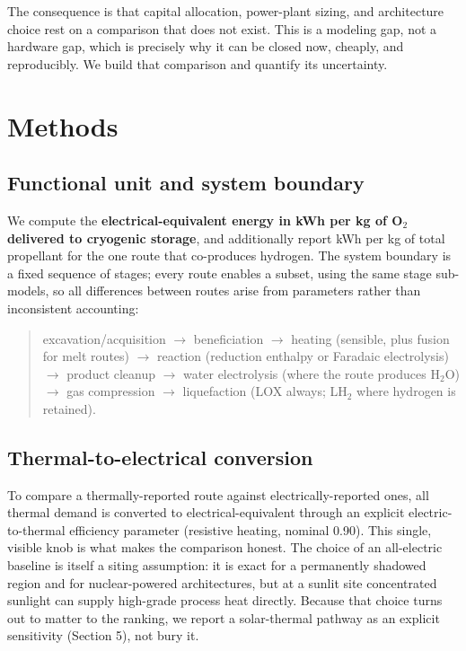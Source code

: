 \documentclass[11pt,a4paper]{article}
\begin{document}
The consequence is that capital allocation, power-plant sizing, and architecture choice
rest on a comparison that does not exist. This is a modeling gap, not a hardware gap,
which is precisely why it can be closed now, cheaply, and reproducibly. We build that
comparison and quantify its uncertainty.

\section{Methods}

\subsection{Functional unit and system boundary}

We compute the \textbf{electrical-equivalent energy in kWh per kg of O$_2$ delivered to
cryogenic storage}, and additionally report kWh per kg of total propellant for the one
route that co-produces hydrogen. The system boundary is a fixed sequence of stages;
every route enables a subset, using the same stage sub-models, so all differences
between routes arise from parameters rather than inconsistent accounting:

\begin{quote}
excavation/acquisition $\rightarrow$ beneficiation $\rightarrow$ heating (sensible, plus
fusion for melt routes) $\rightarrow$ reaction (reduction enthalpy or Faradaic
electrolysis) $\rightarrow$ product cleanup $\rightarrow$ water electrolysis (where the
route produces H$_2$O) $\rightarrow$ gas compression $\rightarrow$ liquefaction (LOX
always; LH$_2$ where hydrogen is retained).
\end{quote}

\subsection{Thermal-to-electrical conversion}

To compare a thermally-reported route against electrically-reported ones, all thermal
demand is converted to electrical-equivalent through an explicit electric-to-thermal
efficiency parameter (resistive heating, nominal 0.90). This single, visible knob is what
makes the comparison honest. The choice of an all-electric baseline is itself a siting
assumption: it is exact for a permanently shadowed region and for nuclear-powered
architectures, but at a sunlit site concentrated sunlight can supply high-grade process
heat directly. Because that choice turns out to matter to the ranking, we report a
solar-thermal pathway as an explicit sensitivity (Section 5), not bury it.
\end{document}
